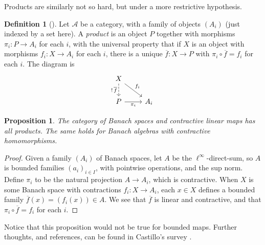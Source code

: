 \documentclass[a4paper,11pt]{article}
\newcommand{\mc}[1]{{\mathcal{#1}}}
\newtheorem{proposition}[lemma]{Proposition}
\theoremstyle{definition}
\newtheorem{definition}[lemma]{Definition}
\begin{document}
Products are similarly not so hard, but under a more restrictive hypothesis.

\begin{definition}[{\cite[Definition~5.1.7]{leinster}}]
Let $\mc A$ be a category, with a family of objects $(A_i)$ (just indexed by a set here).  A \emph{product} is an object $P$ together with morphisms $\pi_i \colon P\to A_i$ for each $i$, with the universal property that if $X$ is an object with morphisms $f_i\colon X\to A_i$ for each $i$, there is a unique $\overline f\colon X\to P$ with $\pi_i\circ\overline f = f_i$ for each $i$.  The diagram is
\[\begin{tikzcd}
X \arrow[rd, "f_i"] \arrow[d, dashed, "!\,\overline f"'] \\
P \arrow[r, "\pi_i"'] & A_i
\end{tikzcd}\]
\end{definition}

\begin{proposition}
The category of Banach spaces and contractive linear maps has all products.  The same holds for Banach algebras with contractive homomorphisms.
\end{proposition}
\begin{proof}
Given a family $(A_i)$ of Banach spaces, let $A$ be the $\ell^\infty$-direct-sum, so $A$ is bounded families $(a_i)_{i\in I}$, with pointwise operations, and the sup norm.  Define $\pi_i$ to be the natural projection $A\to A_i$, which is contractive.  When $X$ is some Banach space with contractions $f_i \colon X\to A_i$, each $x\in X$ defines a bounded family $\overline f(x) = (f_i(x)) \in A$.  We see that $\overline f$ is linear and contractive, and that $\pi_i\circ\overline f = f_i$ for each $i$.
\end{proof}

Notice that this proposition would not be true for bounded maps.  Further thoughts, and references, can be found in Castillo's survey \cite{cas}.
\end{document}
